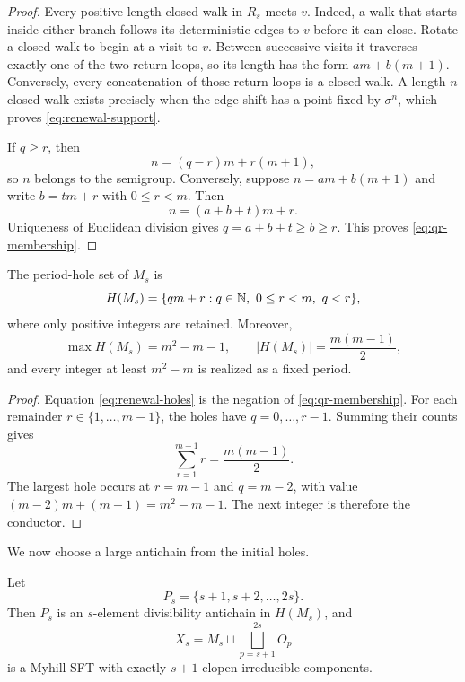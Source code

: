 \begin{proof}
Every positive-length closed walk in $R_s$ meets $v$.  Indeed, a walk that
starts inside either branch follows its deterministic edges to $v$ before it
can close.  Rotate a closed walk to begin at a visit to $v$.  Between
successive visits it traverses exactly one of the two return loops, so its
length has the form $am+b(m+1)$.  Conversely, every concatenation of those
return loops is a closed walk.  A length-$n$ closed walk exists precisely when
the edge shift has a point fixed by $\sigma^n$, which proves
\eqref{eq:renewal-support}.

If $q\geq r$, then
\[
 n=(q-r)m+r(m+1),
\]
so $n$ belongs to the semigroup.  Conversely, suppose
$n=am+b(m+1)$ and write $b=tm+r$ with $0\leq r<m$.  Then
\[
 n=(a+b+t)m+r.
\]
Uniqueness of Euclidean division gives $q=a+b+t\geq b\geq r$.  This proves
\eqref{eq:qr-membership}.
\end{proof}

\begin{corollary}
\label{cor:hole-formulas}
The period-hole set of $M_s$ is
\begin{equation}
 H(M_s)=\{qm+r:q\in\N,\ 0\leq r<m,\ q<r\},
 \label{eq:renewal-holes}
\end{equation}
where only positive integers are retained.  Moreover,
\begin{equation}
 \max H(M_s)=m^2-m-1,
 \qquad
 |H(M_s)|=\frac{m(m-1)}2,
 \label{eq:hole-count}
\end{equation}
and every integer at least $m^2-m$ is realized as a fixed period.
\end{corollary}

\begin{proof}
Equation \eqref{eq:renewal-holes} is the negation of
\eqref{eq:qr-membership}.  For each remainder $r\in\{1,\ldots,m-1\}$, the
holes have $q=0,\ldots,r-1$.  Summing their counts gives
\[
 \sum_{r=1}^{m-1}r=\frac{m(m-1)}2.
\]
The largest hole occurs at $r=m-1$ and $q=m-2$, with value
$(m-2)m+(m-1)=m^2-m-1$.  The next integer is therefore the conductor.
\end{proof}

We now choose a large antichain from the initial holes.

\begin{theorem}
\label{thm:many-components}
Let
\begin{equation}
 P_s=\{s+1,s+2,\ldots,2s\}.
 \label{eq:Ps}
\end{equation}
Then $P_s$ is an $s$-element divisibility antichain in $H(M_s)$, and
\begin{equation}
 X_s=M_s\sqcup\bigsqcup_{p=s+1}^{2s}O_p
 \label{eq:Xs}
\end{equation}
is a Myhill SFT with exactly $s+1$ clopen irreducible components.
\end{theorem}

